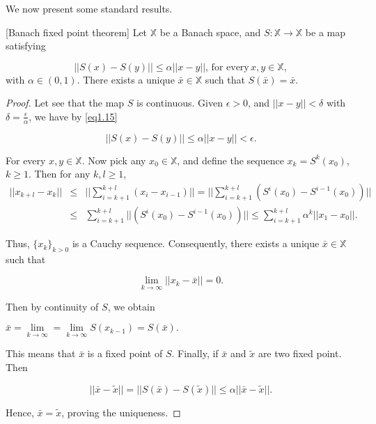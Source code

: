 We now present some standard results.

\begin{theorem}\label{BFT}[Banach fixed point theorem]
	Let $\mathbb{X}$ be a Banach space, and $S: \mathbb{X} \rightarrow \mathbb{X}$ be a map satisfying 
	
	\begin{equation}\label{eq1.15}
	||S(x)-S(y)||\leq \alpha ||x-y||,\,\mbox{for every}\, x,y \in \mathbb{X},
	\end{equation}
with $\alpha \in (0,1)$. There exists a unique $\bar{x} \in \mathbb{X}$ such that $S(\bar{x})=\bar{x}$.
\end{theorem}
\begin{proof}
	Let see that the map $S$ is continuous. Given $\epsilon>0$, and $||x-y||<\delta$ with $\delta=\frac{\epsilon}{\alpha}$, we have by \ref{eq1.15}
	
	$$||S(x)-S(y)||\leq \alpha ||x-y||<\epsilon.$$
	
	For every $x,y \in \mathbb{X}$. Now pick any $x_0 \in \mathbb{X}$, and define the sequence $x_k=S^k(x_0)$, $k\geq 1$. 
Then for any $k,l\geq 1$,
\begin{eqnarray*}
||x_{k+l}-x_{k}||&\leq& ||\sum_{i=k+1}^{k+l}(x_i-x_{i-1})||=||\sum_{i=k+1}^{k+l}(S^i(x_0)-S^{i-1}(x_0))||\\
&\leq& \sum_{i=k+1}^{k+l}||(S^i(x_0)-S^{i-1}(x_0))||\leq \sum_{i=k+1}^{k+l} \alpha^k||x_1-x_0||.
\end{eqnarray*}

Thus, $\{x_k\}_{k>0}$ is a Cauchy sequence. Consequently, there exists a unique $\bar{x} \in \mathbb{X}$ such that 

$$\lim_{k\rightarrow \infty}||x_k-\bar{x}||=0.$$

Then by continuity of $S$, we obtain

\begin{center}
	$\bar{x}=\lim\limits_{k\rightarrow \infty}=\lim\limits_{k \rightarrow \infty} S(x_{k-1})=S(\bar{x}).$
\end{center}

This means that $\bar{x}$ is a fixed point of $S$. Finally, if $\bar{x}$ and $\tilde{x}$ are two fixed point. Then

$$||\bar{x}-\tilde{x}||=||S(\bar{x})-S(\tilde{x})||\leq \alpha ||\bar{x}-\tilde{x}||.$$

Hence, $\bar{x}=\tilde{x}$, proving the uniqueness.	
\end{proof}


